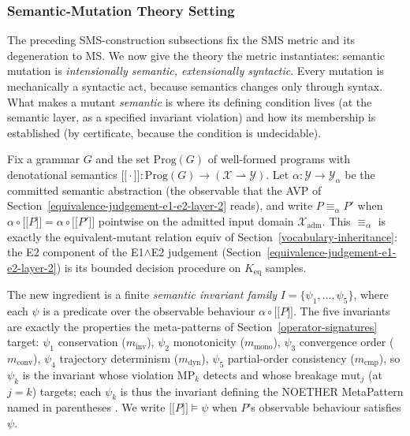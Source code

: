 \documentclass[manuscript,screen,review]{acmart}
\begin{document}

\subsubsection{Semantic-Mutation Theory Setting}\label{theory-setting}

The preceding SMS-construction subsections fix the SMS metric and its degeneration to MS. We now
give the theory the metric instantiates: semantic mutation is
\emph{intensionally semantic, extensionally syntactic}. Every mutation
is mechanically a syntactic act, because semantics changes only through
syntax. What makes a mutant \emph{semantic} is where its defining
condition lives (at the semantic layer, as a specified invariant
violation) and how its membership is established (by certificate,
because the condition is undecidable).

Fix a grammar $G$ and the set $\mathrm{Prog}(G)$ of well-formed programs
with denotational semantics
$\mathopen{\lbrack\!\lbrack}\cdot\mathclose{\rbrack\!\rbrack} : \mathrm{Prog}(G) \to (\mathcal{X} \rightharpoonup \mathcal{Y})$.
Let $\alpha : \mathcal{Y} \to \mathcal{Y}_\alpha$ be the committed
semantic abstraction (the observable that the AVP of Section~\ref{equivalence-judgement-e1-e2-layer-2} reads), and
write $P \equiv_\alpha P'$ when
$\alpha \circ \mathopen{\lbrack\!\lbrack} P \mathclose{\rbrack\!\rbrack} = \alpha \circ \mathopen{\lbrack\!\lbrack} P' \mathclose{\rbrack\!\rbrack}$
pointwise on the admitted input domain $\mathcal{X}_{\mathrm{adm}}$.
This $\equiv_\alpha$ is exactly the equivalent-mutant relation
$\mathrm{equiv}$ of Section~\ref{vocabulary-inheritance}: the E2 component of the E1$\wedge$E2 judgement
(Section~\ref{equivalence-judgement-e1-e2-layer-2}) is its bounded decision procedure on $K_{\mathrm{eq}}$ samples.

The new ingredient is a finite \emph{semantic invariant family}
$I = \{\psi_1, \dots, \psi_5\}$, where each $\psi$ is a predicate over
the observable behaviour $\alpha \circ \mathopen{\lbrack\!\lbrack} P \mathclose{\rbrack\!\rbrack}$. The five
invariants are exactly the properties the meta-patterns of Section~\ref{operator-signatures} target:
$\psi_1$ conservation ($m_{\mathrm{inv}}$), $\psi_2$ monotonicity
($m_{\mathrm{mono}}$), $\psi_3$ convergence order ($m_{\mathrm{conv}}$),
$\psi_4$ trajectory determinism ($m_{\mathrm{dyn}}$), $\psi_5$ partial-order
consistency ($m_{\mathrm{cmp}}$), so
$\psi_k$ is the invariant whose violation MP$_k$ detects and whose
breakage $\mathrm{mut}_j$ (at $j=k$) targets; each $\psi_k$ is thus the
invariant defining the NOETHER MetaPattern named in parentheses
\citep{noether2026}. We write
$\mathopen{\lbrack\!\lbrack} P \mathclose{\rbrack\!\rbrack} \models \psi$ when $P$'s observable behaviour
satisfies $\psi$.
\end{document}
